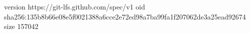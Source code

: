 version https://git-lfs.github.com/spec/v1
oid sha256:135b8b66e08e5f0021388a6cce2e72ed98a7ba99fa1f207062de3a25ead92674
size 157042
